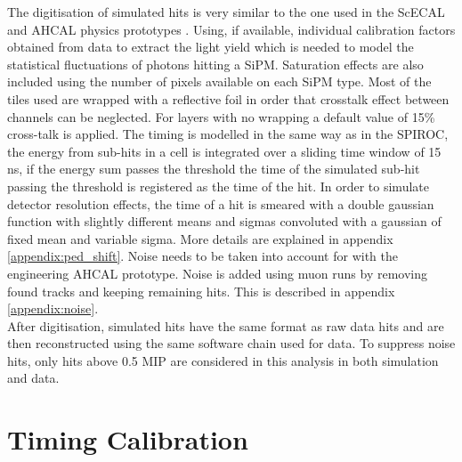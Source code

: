 \documentclass[twoside,a4paper,11pt]{article}
\begin{document}
The digitisation of simulated hits is very similar to the one used in the ScECAL and AHCAL physics prototypes \cite{CAN-002, CAN-010, JINST-6}. Using, if available, individual calibration factors obtained from data to extract the light yield which is needed to model the statistical fluctuations of photons hitting a SiPM. Saturation effects are also included using the number of pixels available on each SiPM type. Most of the tiles used are wrapped with a reflective foil in order that crosstalk effect between channels can be neglected. For layers with no wrapping a default value of 15\% cross-talk is applied. The timing is modelled in the same way as in the SPIROC, the energy from sub-hits in a cell is integrated over a sliding time window of 15 ns, if the energy sum passes the threshold the time of the simulated sub-hit passing the threshold is registered as the time of the hit. In order to simulate detector resolution effects, the time of a hit is smeared with a double gaussian function with slightly different means and sigmas convoluted with a gaussian of fixed mean and variable sigma. More details are explained in appendix \ref{appendix:ped_shift}. Noise needs to be taken into account for with the engineering AHCAL prototype. Noise is added using muon runs by removing found tracks and keeping remaining hits. This is described in appendix \ref{appendix:noise}.\\
After digitisation, simulated hits have the same format as raw data hits and are then reconstructed using the same software chain used for data. To suppress noise hits, only hits above 0.5 MIP are considered in this analysis in both simulation and data.

\section{Timing Calibration}
\end{document}

